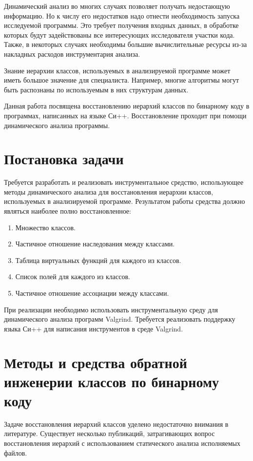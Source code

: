 \documentclass[a4paper,12pt,russian]{article}
\newcommand{\code}[1]{\textsf{#1}}
\begin{document}
Динамический анализ во многих случаях позволяет получать недостающую информацию. Но к числу его недостатков надо отнести необходимость запуска исследуемой программы.
Это требует получения входных данных, в обработке которых будут задействованы все интересующих исследователя участки кода.
Также, в некоторых случаях необходимы большие вычислительные ресурсы из-за накладных расходов инструментария анализа.

Знание иерархии классов, используемых в анализируемой программе может иметь большое значение для специалиста. Например, многие алгоритмы могут быть распознаны по используемым в них структурам данных.

Данная работа посвящена восстановлению иерархий классов по бинарному коду в программах, написанных на языке Си++.
Восстановление проходит при помощи динамического анализа программы.

\newpage
\section{Постановка задачи}
Требуется разработать и реализовать инструментальное средство, использующее методы динамического анализа для восстановления иерархии классов, используемых в анализируемой программе.
Результатом работы средства должно являться наиболее полно восстановленное:
\begin{enumerate}
\item Множество классов.
\item Частичное отношение наследования между классами.
\item Таблица виртуальных функций для каждого из классов.
\item Список полей для каждого из классов.
\item Частичное отношение ассоциации между классами.
\end{enumerate}

При реализации необходимо использовать инструментальную среду для динамического анализа программ \code{Valgrind}.
Требуется реализовать поддержку языка Си++ для написания инструментов в среде \code{Valgrind}.

\newpage
\section{Методы и средства обратной инженерии классов по бинарному коду}
\label{reverse_eng_overview}
Задаче восстановления иерархий классов уделено недостаточно внимания в литературе.
Существует несколько публикаций, затрагивающих вопрос восстановления иерархий с использованием статического анализа исполняемых файлов.
\end{document}
